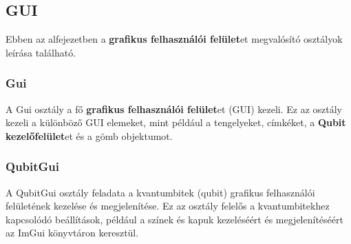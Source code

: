 \documentclass[fontsize=12pt,a4paper]{article}
\begin{document}
\begin{table}[h!]
    \centering
\end{table}

\subsection{GUI}

Ebben az alfejezetben a \textbf{grafikus felhasználói felület}et megvalósító osztályok leírása található.

\subsubsection{Gui}

A Gui osztály a fő \textbf{grafikus felhasználói felület}et (GUI) kezeli. Ez az osztály kezeli a különböző GUI elemeket, mint például a tengelyeket, címkéket, a \textbf{Qubit kezelőfelület}et és a gömb objektumot.

\subsubsection{QubitGui}

A QubitGui osztály feladata a kvantumbitek (qubit) grafikus felhasználói felületének kezelése és megjelenítése. Ez az osztály felelős a kvantumbitekhez kapcsolódó beállítások, például a színek és kapuk kezeléséért és megjelenítéséért az ImGui könyvtáron keresztül.
\end{document}
